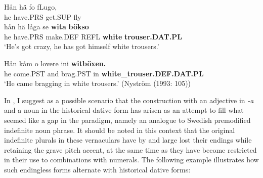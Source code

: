 

\item 


 \ea\label{}
\gll Hån  hä  fo  fLugo,\\


he  have.PRS  get.SUP  fly\\

 \ea\label{}
\gll hån  hä  låga  se  \textbf{wita} \textbf{bökso}\\


he  have.PRS  make.DEF  REFL  \textbf{white} \textbf{trouser.DAT.PL}\\

\glt ‘He’s got crazy, he has got himself white trousers.’

\z

\item 


 \ea\label{}
\gll Hån  kåm  o  lovere  ini  \textbf{witböxen.}\\


he  come.PST  and  brag.PST  in  \textbf{white\_trouser.DEF.DAT.PL}\\

\glt ‘He came bragging in white trousers.’ (Nyström (1993: 105))

\z

In \citet{Dahl2008}, I suggest as a possible scenario that the construction with an adjective in\textit{ {}-a} and a noun in the historical dative form has arisen as an attempt to fill what seemed like a gap in the paradigm, namely an analogue to Swedish premodified indefinite noun phrase. It should be noted in this context that the original indefinite plurals in these vernaculars have by and large lost their endings while retaining the grave pitch accent, at the same time as they have become restricted in their use to combinations with numerals. The following example illustrates how such endingless forms alternate with historical dative forms: 

